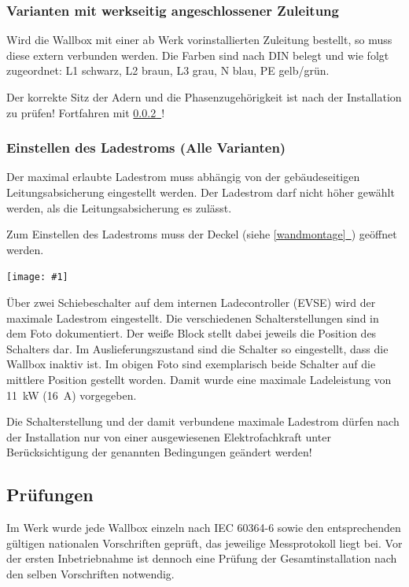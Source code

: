 \documentclass[a4paper,10pt]{article}
\newcommand{\hint}[1]{\begin{tcolorbox}[colback=boxgray,colframe=black,coltext=
white,title=Hinweis]#1\end{tcolorbox}}
\newcommand{\gfx}[1]{\texttt{[image: \#1]}}
\newcommand*{\fullref}[1]{\hyperref[{#1}]{\ref*{#1}~\nameref*{#1}}}
\begin{document}
\begin{multicols*}{2}
	\subsubsection{Varianten mit werkseitig angeschlossener Zuleitung}
	Wird die Wallbox mit einer ab Werk vorinstallierten Zuleitung bestellt, so
	muss diese extern verbunden werden. Die Farben sind nach DIN belegt und wie
	folgt zugeordnet: L1 schwarz, L2 braun, L3 grau, N blau, PE gelb/grün.
	
	Der korrekte Sitz der Adern und die Phasenzugehörigkeit ist nach der
	Installation zu prüfen! Fortfahren mit \fullref{ladestrom_schalter}!

	\subsubsection{Einstellen des Ladestroms (Alle Varianten)}\label{ladestrom_schalter}
	Der maximal erlaubte Ladestrom muss abhängig von der gebäudeseitigen
	Leitungsabsicherung eingestellt werden. Der Ladestrom darf nicht höher gewählt
	werden, als die Leitungsabsicherung es zulässt.

	Zum Einstellen des Ladestroms muss der Deckel (siehe \fullref{wandmontage})
	geöffnet werden. 

	\gfx{./img_warp2/resized/warp_evse_switch_cut_ready_small}

	Über zwei Schiebeschalter auf dem internen Ladecontroller (EVSE) wird der
	maximale Ladestrom eingestellt. Die verschiedenen Schalterstellungen sind in
	dem Foto dokumentiert. Der weiße Block stellt dabei jeweils die Position
	des Schalters dar. Im Auslieferungszustand sind die Schalter so eingestellt,
	dass die Wallbox inaktiv ist. Im obigen Foto sind exemplarisch beide
	Schalter auf die mittlere Position gestellt worden. Damit wurde eine
	maximale Ladeleistung von \SI{11}{\kilo\watt} (\SI{16}{\ampere}) vorgegeben.
	\hint{Die Schalterstellung und der damit verbundene maximale Ladestrom dürfen nach der
		Installation nur von einer ausgewiesenen Elektrofachkraft unter
		Berücksichtigung der genannten Bedingungen geändert werden!}

	\subsection{Prüfungen}\label{tests}
	Im Werk wurde jede Wallbox einzeln nach IEC 60364-6 sowie den entsprechenden gültigen
	nationalen Vorschriften geprüft, das jeweilige Messprotokoll liegt bei.
	Vor der ersten Inbetriebnahme ist dennoch eine Prüfung der Gesamtinstallation
	nach den selben Vorschriften notwendig.


\end{multicols*}
\end{document}
